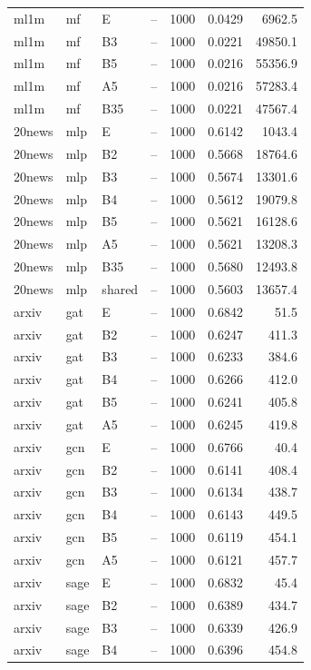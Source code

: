 \begin{longtable}{llllrrr}
ml1m & mf & E & -- & 1000 & 0.0429 & 6962.5 \\
ml1m & mf & B3 & -- & 1000 & 0.0221 & 49850.1 \\
\rowcolor{oursbg}
ml1m & mf & B5 & -- & 1000 & 0.0216 & 55356.9 \\
ml1m & mf & A5 & -- & 1000 & 0.0216 & 57283.4 \\
ml1m & mf & B35 & -- & 1000 & 0.0221 & 47567.4 \\
20news & mlp & E & -- & 1000 & 0.6142 & 1043.4 \\
20news & mlp & B2 & -- & 1000 & 0.5668 & 18764.6 \\
20news & mlp & B3 & -- & 1000 & 0.5674 & 13301.6 \\
20news & mlp & B4 & -- & 1000 & 0.5612 & 19079.8 \\
\rowcolor{oursbg}
20news & mlp & B5 & -- & 1000 & 0.5621 & 16128.6 \\
20news & mlp & A5 & -- & 1000 & 0.5621 & 13208.3 \\
20news & mlp & B35 & -- & 1000 & 0.5680 & 12493.8 \\
20news & mlp & shared & -- & 1000 & 0.5603 & 13657.4 \\
arxiv & gat & E & -- & 1000 & 0.6842 & 51.5 \\
arxiv & gat & B2 & -- & 1000 & 0.6247 & 411.3 \\
arxiv & gat & B3 & -- & 1000 & 0.6233 & 384.6 \\
arxiv & gat & B4 & -- & 1000 & 0.6266 & 412.0 \\
\rowcolor{oursbg}
arxiv & gat & B5 & -- & 1000 & 0.6241 & 405.8 \\
arxiv & gat & A5 & -- & 1000 & 0.6245 & 419.8 \\
arxiv & gcn & E & -- & 1000 & 0.6766 & 40.4 \\
arxiv & gcn & B2 & -- & 1000 & 0.6141 & 408.4 \\
arxiv & gcn & B3 & -- & 1000 & 0.6134 & 438.7 \\
arxiv & gcn & B4 & -- & 1000 & 0.6143 & 449.5 \\
\rowcolor{oursbg}
arxiv & gcn & B5 & -- & 1000 & 0.6119 & 454.1 \\
arxiv & gcn & A5 & -- & 1000 & 0.6121 & 457.7 \\
arxiv & sage & E & -- & 1000 & 0.6832 & 45.4 \\
arxiv & sage & B2 & -- & 1000 & 0.6389 & 434.7 \\
arxiv & sage & B3 & -- & 1000 & 0.6339 & 426.9 \\
arxiv & sage & B4 & -- & 1000 & 0.6396 & 454.8 \\

\end{longtable}
